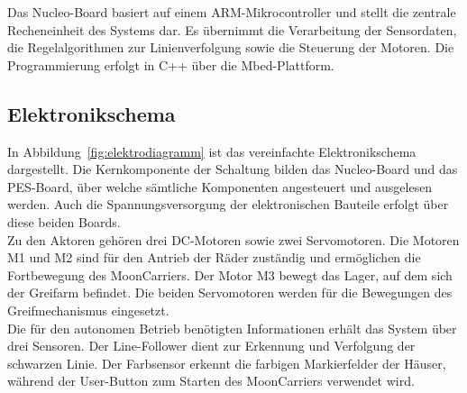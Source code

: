 \documentclass[11pt,a4paper]{article}
\begin{document}
	\noindent
	Das Nucleo-Board basiert auf einem ARM-Mikrocontroller und stellt die zentrale Recheneinheit des Systems dar. Es übernimmt die Verarbeitung der Sensordaten, die Regelalgorithmen zur Linienverfolgung sowie die Steuerung der Motoren. Die Programmierung erfolgt in C++ über die Mbed-Plattform.\\
	
	\subsection{Elektronikschema}
	In Abbildung~\ref{fig:elektrodiagramm} ist das vereinfachte Elektronikschema dargestellt. Die Kernkomponente der Schaltung bilden das Nucleo-Board und das PES-Board, über welche sämtliche Komponenten angesteuert und ausgelesen werden. Auch die Spannungsversorgung der elektronischen Bauteile erfolgt über diese beiden Boards.\\
	
	\noindent
	Zu den Aktoren gehören drei DC-Motoren sowie zwei Servomotoren. Die Motoren M1 und M2 sind für den Antrieb der Räder zuständig und ermöglichen die Fortbewegung des MoonCarriers. Der Motor M3 bewegt das Lager, auf dem sich der Greifarm befindet. Die beiden Servomotoren werden für die Bewegungen des Greifmechanismus eingesetzt.\\
	
	\noindent
	Die für den autonomen Betrieb benötigten Informationen erhält das System über drei Sensoren. Der Line-Follower dient zur Erkennung und Verfolgung der schwarzen Linie. Der Farbsensor erkennt die farbigen Markierfelder der Häuser, während der User-Button zum Starten des MoonCarriers verwendet wird.
	
\end{document}
